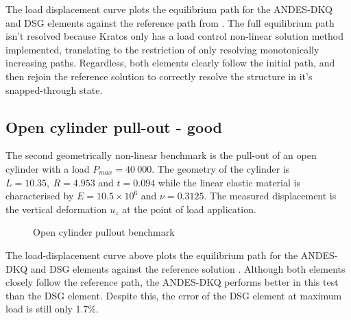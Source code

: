  
The load displacement curve plots the equilibrium path for the ANDES-DKQ and DSG elements against the reference path from \cite{Sze2004}. The full equilibrium path isn't resolved because Kratos only has a load control non-linear solution method implemented, translating to the restriction of only resolving monotonically increasing paths. Regardless, both elements clearly follow the initial path, and then rejoin the reference solution to correctly resolve the structure in it's snapped-through state.

\newpage
\subsection{Open cylinder pull-out - good}

The second geometrically non-linear benchmark is the pull-out of an open cylinder with a load $P_{max} = 40\ 000$. The geometry of the cylinder is $L= 10.35,\ R = 4.953$ and $t = 0.094$ while the linear elastic material is characterised by $E = 10.5\times10^6$ and $\nu = 0.3125$. The measured displacement is the vertical deformation $u_z$ at the point of load application.

 
\begin{figure}[H]
	\caption{\label{ref_label_overall}Open cylinder pullout benchmark}
\end{figure}

 The load-displacement curve above plots the equilibrium path for the ANDES-DKQ and DSG elements against the reference solution \cite{Sze2004}. Although both elements closely follow the reference path, the ANDES-DKQ performs better in this test than the DSG element. Despite this, the error of the DSG element at maximum load is still only 1.7\%.


